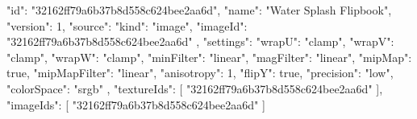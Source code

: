 {
  "id": "32162ff79a6b37b8d558c624bee2aa6d",
  "name": "Water Splash Flipbook",
  "version": 1,
  "source": {
    "kind": "image",
    "imageId": "32162ff79a6b37b8d558c624bee2aa6d"
  },
  "settings": {
    "wrapU": "clamp",
    "wrapV": "clamp",
    "wrapW": "clamp",
    "minFilter": "linear",
    "magFilter": "linear",
    "mipMap": true,
    "mipMapFilter": "linear",
    "anisotropy": 1,
    "flipY": true,
    "precision": "low",
    "colorSpace": "srgb"
  },
  "textureIds": [
    "32162ff79a6b37b8d558c624bee2aa6d"
  ],
  "imageIds": [
    "32162ff79a6b37b8d558c624bee2aa6d"
  ]
}
